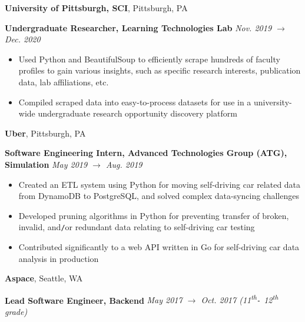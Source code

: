 \documentclass[10pt]{article}
\begin{document}
\begin{flushleft}
		\vspace{-1.50mm}
		\textbf{University of Pittsburgh, SCI}, Pittsburgh, PA\\
		\begin{leftli}
			{\small \textbf{Undergraduate Researcher, Learning Technologies Lab}} \hfill \textit{\small Nov. 2019 $\rightarrow$ Dec. 2020}
			\begin{itemize}
				\item Used Python and BeautifulSoup to efficiently scrape hundreds of faculty profiles to gain various insights, such as specific research interests, publication data, lab affiliations, etc.
				\vspace{-2mm}
				\item Compiled scraped data into easy-to-process datasets for use in a university-wide undergraduate research opportunity discovery platform
			\end{itemize}
		\end{leftli}

		\vspace{-1.50mm}
		\textbf{Uber}, Pittsburgh, PA\\
		\begin{leftli}
			{\small \textbf{Software Engineering Intern, Advanced Technologies Group (ATG), Simulation}} \hfill \textit{\small May 2019 $\rightarrow$ Aug. 2019}
			\begin{itemize}
				\item Created an ETL system using Python for moving self-driving car related data from DynamoDB to PostgreSQL, and solved complex data-syncing challenges
				\vspace{-2mm}
				\item Developed pruning algorithms in Python for preventing transfer of broken, invalid, and\texttt{/}or redundant data relating to self-driving car testing
				\vspace{-2mm}
				\item Contributed significantly to a web API written in Go for self-driving car data analysis in production
			\end{itemize}
		\end{leftli}

		\vspace{-1.50mm}
		\textbf{Aspace}, Seattle, WA\\
		\begin{leftli}
			{\small \textbf{Lead Software Engineer, Backend}} \hfill \textit{\small May 2017 $\rightarrow$ Oct. 2017 (11\textsuperscript{th}\texttt{-} 12\textsuperscript{th} grade)}


\end{leftli}
\end{flushleft}
\end{document}
